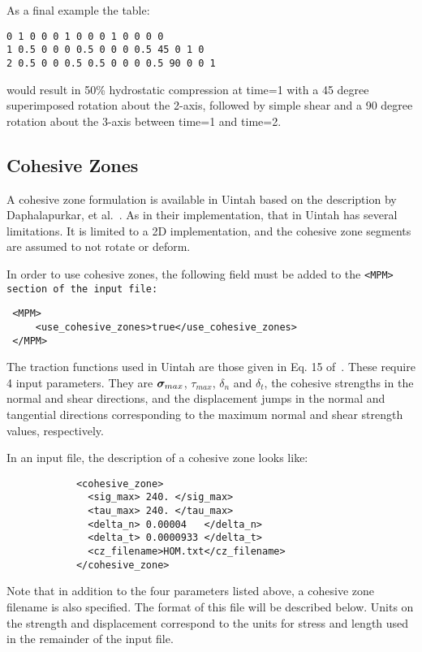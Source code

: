 As a final example the table:
\begin{Verbatim}
0 1 0 0 0 1 0 0 0 1 0 0 0 0
1 0.5 0 0 0 0.5 0 0 0 0.5 45 0 1 0
2 0.5 0 0 0.5 0.5 0 0 0 0.5 90 0 0 1
\end{Verbatim}
would result in 50\% hydrostatic compression at time=1 with a 45 degree superimposed rotation about the 2-axis, followed by  simple shear and a 90 degree rotation about the 3-axis between time=1 and time=2.

\subsection{Cohesive Zones} \label{Sec:CohesiveZones}
A cohesive zone formulation is available in Uintah based on the description
by Daphalapurkar, et al.~\cite{Daphalapurkar}.  As in their implementation,
that in Uintah has several limitations.  It is limited to a 2D implementation,
and the cohesive zone segments are assumed to not rotate or deform.

In order to use cohesive zones, the following field must be added to the
\tt <MPM> \normalfont section of the input file:

\begin{Verbatim}
 <MPM>
     <use_cohesive_zones>true</use_cohesive_zones>
 </MPM>
\end{Verbatim}

The traction functions used in Uintah are those given in Eq. 15
of~\cite{Daphalapurkar}.  These require 4 input parameters.  They are
$\mbox{\boldmath $\sigma \!\!$ \unboldmath}_{max}$, $\tau_{max}$, $\delta_n$ and $\delta_t$, the cohesive strengths
in the normal and shear directions, and the displacement jumps in the normal and
tangential directions corresponding to the maximum normal and shear strength
values, respectively.

In an input file, the description of a cohesive zone looks like:

\begin{Verbatim}
            <cohesive_zone>
              <sig_max> 240. </sig_max>
              <tau_max> 240. </tau_max>
              <delta_n> 0.00004   </delta_n>
              <delta_t> 0.0000933 </delta_t>
              <cz_filename>HOM.txt</cz_filename>
            </cohesive_zone>
\end{Verbatim}

Note that in addition to the four parameters listed above, a cohesive zone
filename is also specified.  The format of this file will be described below.
Units on the strength and displacement correspond to the units for
stress and length used in the remainder of the input file.

